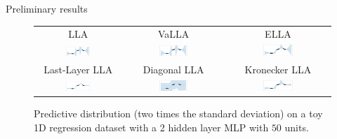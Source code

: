 \documentclass[aspectratio=149]{beamer}
\begin{document}
    \begin{frame}{Preliminary results}
        \begin{figure}
        	\begin{center}
        	\begin{tabular}{ccc}
            {\scriptsize LLA }& {\scriptsize VaLLA }& {\scriptsize ELLA} \\
        	\includegraphics[width=0.30\textwidth]{imgs/LLA} & \includegraphics[width=0.30\textwidth]{imgs/VaLLA} & \includegraphics[width=0.30\textwidth]{imgs/ELLA.pdf} \\
            {\scriptsize Last-Layer LLA} & {\scriptsize Diagonal LLA} & {\scriptsize Kronecker LLA}\\
        	\includegraphics[width=0.30\textwidth]{imgs/LL-LLA.pdf} & \includegraphics[width=0.30\textwidth]{imgs/Diag-LLA.pdf} & \includegraphics[width=0.30\textwidth]{imgs/LLA-KFAC.pdf} \\
        	\end{tabular}
        	\end{center}
            \caption{Predictive distribution (two times the standard deviation) on a toy 1D regression dataset with a 2 hidden layer MLP with \(50\) units.}
            \label{fig:intro}
        \end{figure}

    \end{frame}
    
\end{document}
